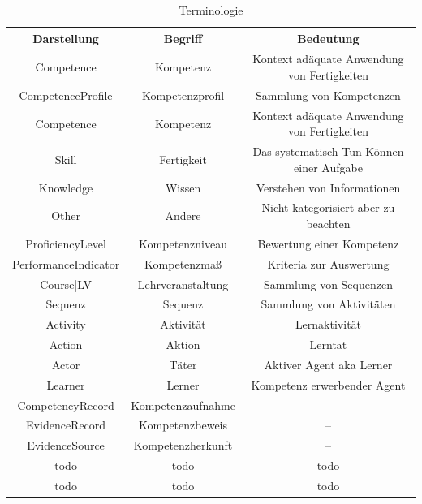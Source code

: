 \documentclass[
12pt,
english,
ngerman,
headsepline,
twoside,
openright,
numbers=noenddot,version=first
]{scrreprt}
\providecommand{\tabularnewline}{\\}
\begin{document}
\begin{table}[H]
\caption{Terminologie}\label{tab:terms}


\noindent \centering{}\begin{tabular}{ccc}
\hline
\noalign{\vskip\doublerulesep}
Darstellung & Begriff & Bedeutung\tabularnewline[\doublerulesep]
\hline
\noalign{\vskip\doublerulesep}
Competence & Kompetenz & Kontext adäquate Anwendung von Fertigkeiten \tabularnewline[\doublerulesep]
\noalign{\vskip\doublerulesep}
CompetenceProfile & Kompetenzprofil & Sammlung von Kompetenzen \tabularnewline[\doublerulesep]
\noalign{\vskip\doublerulesep}
Competence & Kompetenz & Kontext adäquate Anwendung von Fertigkeiten \tabularnewline[\doublerulesep]
\noalign{\vskip\doublerulesep}
Skill & Fertigkeit & Das systematisch Tun-Können einer Aufgabe \tabularnewline[\doublerulesep]
\noalign{\vskip\doublerulesep}
Knowledge & Wissen & Verstehen von Informationen
\tabularnewline[\doublerulesep]
\noalign{\vskip\doublerulesep}
Other & Andere & Nicht kategorisiert aber zu beachten
\tabularnewline[\doublerulesep]
\noalign{\vskip\doublerulesep}
ProficiencyLevel & Kompetenzniveau & Bewertung einer Kompetenz
\tabularnewline[\doublerulesep]
\noalign{\vskip\doublerulesep}
PerformanceIndicator & Kompetenzmaß & Kriteria zur Auswertung
\tabularnewline[\doublerulesep]
\noalign{\vskip\doublerulesep}
Course|LV & Lehrveranstaltung & Sammlung von Sequenzen
\tabularnewline[\doublerulesep]
\noalign{\vskip\doublerulesep}
Sequenz & Sequenz & Sammlung von Aktivitäten
\tabularnewline[\doublerulesep]
\noalign{\vskip\doublerulesep}
Activity & Aktivität & Lernaktivität
\tabularnewline[\doublerulesep]
\noalign{\vskip\doublerulesep}
Action & Aktion & Lerntat
\tabularnewline[\doublerulesep]
\noalign{\vskip\doublerulesep}
Actor & Täter & Aktiver Agent aka Lerner
\tabularnewline[\doublerulesep]
\noalign{\vskip\doublerulesep}
Learner & Lerner & Kompetenz erwerbender Agent
\tabularnewline[\doublerulesep]
\noalign{\vskip\doublerulesep}
CompetencyRecord & Kompetenzaufnahme & --
\tabularnewline[\doublerulesep]
\noalign{\vskip\doublerulesep}
EvidenceRecord & Kompetenzbeweis & --
\tabularnewline[\doublerulesep]
\noalign{\vskip\doublerulesep}
EvidenceSource & Kompetenzherkunft & --
\tabularnewline[\doublerulesep]
\noalign{\vskip\doublerulesep}
todo & todo & todo
\tabularnewline[\doublerulesep]
\noalign{\vskip\doublerulesep}
todo & todo & todo
\tabularnewline[\doublerulesep]
\hline
\end{tabular}
\end{table}
\end{document}
